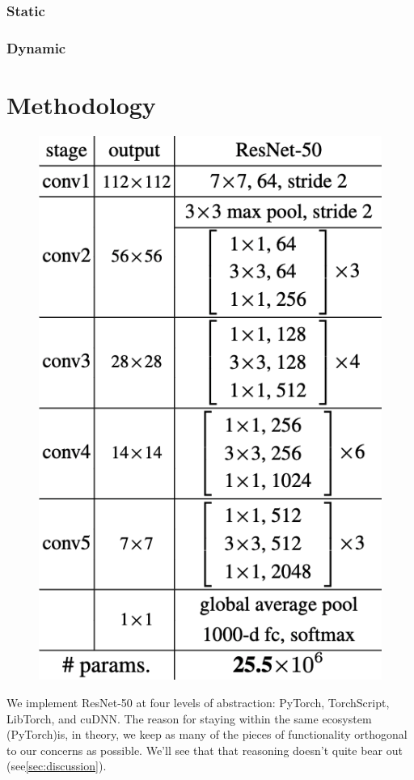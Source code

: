 \documentclass[sigconf]{acmart}
\begin{document}
\subsubsection{Static}

\subsubsection{Dynamic}

\section{Methodology}\label{sec:context}

\begin{figure}
  \includegraphics[width=.7\linewidth]{plots/resnet50.png}\label{fig:figure5}
\end{figure}

We implement ResNet-50 at four levels of abstraction: PyTorch, TorchScript, LibTorch, and cuDNN.
The reason for staying within the same ecosystem (PyTorch)is, in theory, we keep as many of the pieces of functionality orthogonal to our concerns as possible.
We'll see that that reasoning doesn't quite bear out (see\ref{sec:discussion}).
\end{document}
